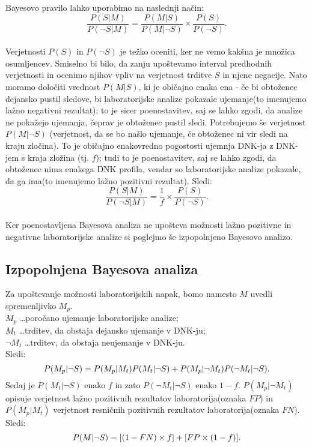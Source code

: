 \documentclass[12pt,a4paper]{amsart}
\theoremstyle{definition} %
\theoremstyle{plain} %
\begin{document}
Bayesovo pravilo lahko uporabimo na naslednji način:
\[\frac{P(S \lvert M)}{P(\neg S \lvert M)} = \frac{P(M \lvert S)}{P(M \lvert \neg S)} \times \frac{P(S)}{P(\neg S)}.\] \\
Verjetnosti $P(S)$ in $P(\neg S)$ je težko oceniti, ker ne vemo kakšna je množica osumljencev. Smiselno bi bilo, da zanju upoštevamo interval 
predhodnih verjetnosti in ocenimo njihov vpliv na verjetnost trditve $S$ in njene negacije. Nato moramo določiti vrednost $P(M \lvert S)$, ki 
je običajno enaka ena - če bi obtoženec dejansko pustil sledove, bi laboratorijske analize pokazale ujemanje(to imenujemo lažno 
negativni rezultat); to je sicer poenostavitev, saj se lahko zgodi, da analize ne pokažejo ujemanja, čeprav je obtoženec pustil sledi. 
Potrebujemo še verjetnost $P(M \lvert \neg S)$ (verjetnost, da se bo našlo ujemanje, če obtoženec ni vir sledi na kraju zločina). To je 
običajno enakovredno pogostosti ujemnja DNK-ja z DNK-jem s kraja zložina (tj. $f$); tudi to je poenostavitev, saj se lahko zgodi, da 
obtoženec nima enakega DNK profila, vendar so laboratorijske analize pokazale, da ga ima(to imenujemo lažno 
pozitivni rezultat).
Sledi:
\[\frac{P(S \lvert M)}{P(\neg S \lvert M)} = \frac{1}{f} \times \frac{P(S)}{P(\neg S)}.\] \\

Ker poenostavljena Bayesova analiza ne upošteva možnosti lažno pozitivne in negativne laboratorijske analize si poglejmo še izpopolnjeno 
Bayesovo analizo.

\subsection{Izpopolnjena Bayesova analiza}
Za upoštevanje možnosti laboratorijskih napak, bomo namesto $M$ uvedli spremenljivko $M_p$.\\
$M_p$ \dots poročano ujemanje laboratorijske analize; \\
$M_t$ \dots trditev, da obstaja dejansko ujemanje v DNK-ju;\\
$\neg M_t$ \dots trditev, da obstaja neujemanje v DNK-ju.  \\
 
Sledi:
\[P(M_p \lvert \neg S) = P(M_p \lvert M_t)P(M_t \lvert \neg S) + P(M_p \lvert \neg M_t)P(\neg M_t \lvert \neg S). \vspace{3mm}\]
Sedaj je $P(M_t \lvert \neg S)$ enako $f$ in zato $P(\neg M_t \lvert \neg S)$ enako $1-f$. $P(M_p \lvert \neg M_t)$ opisuje verjetnost lažno
pozitivnih rezultatov laboratorija(oznaka $FP$) in $P(M_p \lvert M_t)$ verjetnost resničnih pozitivnih rezultatov laboratorija(oznaka $FN$).
Sledi: \vspace{2mm}
\[P(M \lvert \neg S) = [(1 - FN) \times f] + [FP \times (1 - f)]. \vspace{3mm}\]
 
\end{document}
